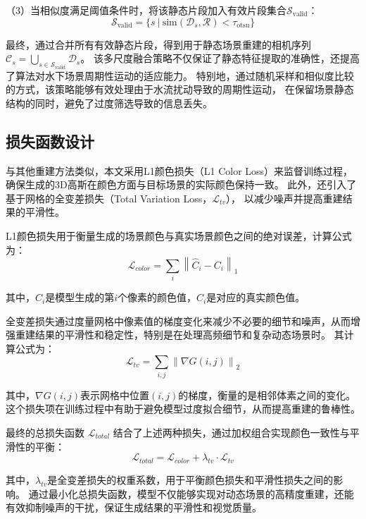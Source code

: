 （3）当相似度满足阈值条件时，将该静态片段加入有效片段集合$\mathcal{S}_{\text{valid}}$：
\begin{equation}
\mathcal{S}_{\text{valid}} = \{s \ | \ \text{sim}(\mathcal{D}_s, \mathcal{R}) < \tau_{\text{otsu}}\}
\end{equation}

最终，通过合并所有有效静态片段，得到用于静态场景重建的相机序列$\mathcal{C}_s=\bigcup_{s\in\mathcal{S}_{\text{valid}}}\mathcal{D}_s$。
该多尺度融合策略不仅保证了静态特征提取的准确性，还提高了算法对水下场景周期性运动的适应能力。
特别地，通过随机采样和相似度比较的方式，该策略能够有效处理由于水流扰动导致的周期性运动，
在保留场景静态结构的同时，避免了过度筛选导致的信息丢失。

\subsection{损失函数设计}
与其他重建方法类似\cite{3DGS}\cite{tineuvox}\cite{dnerf}，本文采用L1颜色损失（L1 Color Loss）来监督训练过程，
确保生成的3D高斯在颜色方面与目标场景的实际颜色保持一致。
此外，还引入了基于网格的全变差损失（Total Variation Loss，$\mathcal{L}_{tv}$），
以减少噪声并提高重建结果的平滑性。

L1颜色损失用于衡量生成的场景颜色与真实场景颜色之间的绝对误差，计算公式为：
\begin{equation}
    \mathcal{L}_{color} = \sum_{i} \left\| \hat{C}_i - C_i \right\|_1
\end{equation}

其中，$\hat{C}_i$是模型生成的第$i$个像素的颜色值，$C_i$是对应的真实颜色值。

全变差损失通过度量网格中像素值的梯度变化来减少不必要的细节和噪声，从而增强重建结果的平滑性和稳定性，特别是在处理高频细节和复杂动态场景时。
其计算公式为：
\begin{equation}
    \mathcal{L}_{tv} = \sum_{i,j} \left\| \nabla G(i,j) \right\|_2
\end{equation}

其中，$\nabla G(i,j)$表示网格中位置$(i,j)$的梯度，衡量的是相邻体素之间的变化。这个损失项在训练过程中有助于避免模型过度拟合细节，从而提高重建的鲁棒性。

最终的总损失函数 $\mathcal{L}_{total}$ 结合了上述两种损失，通过加权组合实现颜色一致性与平滑性的平衡：
$$
\mathcal{L}_{total} = \mathcal{L}_{color} + \lambda_{tv} \cdot \mathcal{L}_{tv}
$$

其中，$\lambda_{tv}$是全变差损失的权重系数，用于平衡颜色损失和平滑性损失之间的影响。
通过最小化总损失函数，模型不仅能够实现对动态场景的高精度重建，还能有效抑制噪声的干扰，保证生成结果的平滑性和视觉质量。

